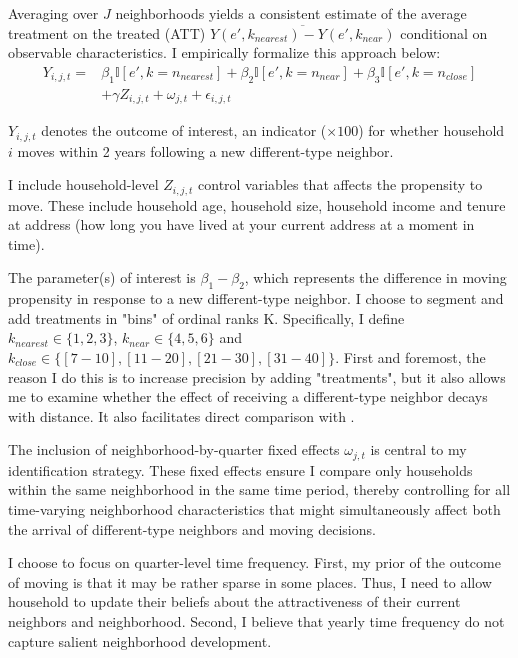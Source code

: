 \documentclass[../main.tex]{subfiles}
\begin{document}
Averaging over $J$ neighborhoods yields a consistent estimate of the average treatment on the treated (ATT) $\overline{Y(e', k_{nearest}) - Y(e', k_{near})}$ conditional on observable characteristics. I empirically formalize this approach below:
\begin{equation}
\begin{split}
    Y_{i, j, t} = &\beta_1 \mathbb{I}[e', k=n_{nearest}] + \beta_2 \mathbb{I}[e', k = n_{near}] + \beta_3 \mathbb{I}[e', k = n_{close}] \\
    & + \gamma Z_{i, j, t} + \omega_{j, t} + \epsilon_{i, j, t}
\label{eq:main_eq_schelling_behavior}
\end{split}
\end{equation}

$Y_{i, j, t}$ denotes the outcome of interest, an indicator ($\times100$) for whether household $i$ moves within 2 years following a new different-type neighbor. 

I include household-level $Z_{i,j,t}$ control variables that affects the propensity to move. These include household age, household size, household income and tenure at address (how long you have lived at your current address at a moment in time). 

The parameter(s) of interest is $\beta_1 - \beta_2$, which represents the difference in moving propensity in response to a new different-type neighbor. I choose to segment and add treatments in "bins" of ordinal ranks K. Specifically, I define $k_{nearest} \in \{1, 2, 3\}$, $k_{near} \in \{4, 5, 6\}$ and $k_{close} \in \{[7-10], [11-20], [21-30], [31-40]\}$. First and foremost, the reason I do this is to increase precision by adding "treatments", but it also allows me to examine whether the effect of receiving a different-type neighbor decays with distance. It also facilitates direct comparison with \textcite{Bayer_2022_nearest_neighbor}.

The inclusion of neighborhood-by-quarter fixed effects $\omega_{j,t}$ is central to my identification strategy. These fixed effects ensure I compare only households within the same neighborhood in the same time period, thereby controlling for all time-varying neighborhood characteristics that might simultaneously affect both the arrival of different-type neighbors and moving decisions.

I choose to focus on quarter-level time frequency. First, my prior of the outcome of moving is that it may be rather sparse in some places. Thus, I need to allow household to update their beliefs about the attractiveness of their current neighbors and neighborhood. Second, I believe that yearly time frequency do not capture salient neighborhood development.  
\end{document}
